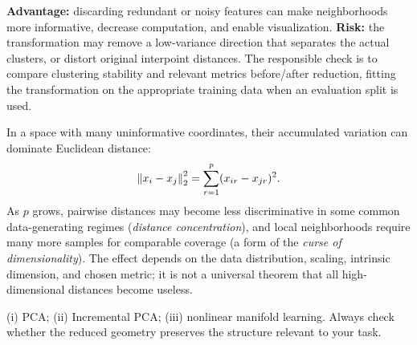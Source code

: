 \textbf{Advantage:} discarding redundant or noisy features can make neighborhoods more informative, decrease computation, and enable visualization. \textbf{Risk:} the transformation may remove a low-variance direction that separates the actual clusters, or distort original interpoint distances. The responsible check is to compare clustering stability and relevant metrics before/after reduction, fitting the transformation on the appropriate training data when an evaluation split is used.

In a space with many uninformative coordinates, their accumulated variation can dominate Euclidean distance:
\[
\left\lVert x_i-x_j\right\rVert_2^2=\sum_{r=1}^{p}(x_{ir}-x_{jr})^2.
\]
As $p$ grows, pairwise distances may become less discriminative in some common data-generating regimes (\emph{distance concentration}), and local neighborhoods require many more samples for comparable coverage (a form of the \emph{curse of dimensionality}). The effect depends on the data distribution, scaling, intrinsic dimension, and chosen metric; it is not a universal theorem that all high-dimensional distances become useless.
\begin{answer}
(i) PCA; (ii) Incremental PCA; (iii) nonlinear manifold learning. Always check whether the reduced geometry preserves the structure relevant to your task.
\end{answer}
